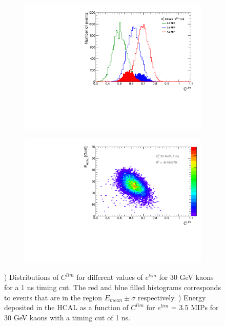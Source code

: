 \begin{figure}[htbp!]
  \centering
  \begin{subfigure}[t]{0.49\textwidth}
    \centering
    \includegraphics[width=1\linewidth]{../Thesis_Plots/ILD/AdditionalPlots/Plots/CLim_1ns_30GeV.pdf}
    \caption{} \label{fig:CLim30_1ns}
  \end{subfigure}
  \hfill
  \begin{subfigure}[t]{0.49\textwidth}
    \centering
    \includegraphics[width=1\linewidth]{../Thesis_Plots/ILD/AdditionalPlots/Plots/EhcalCLim_1ns_30GeV.pdf}
    \caption{} \label{fig:EhcalCLim30_1ns}
  \end{subfigure}
  \caption{) Distributions of $C^{lim}$ for different values of $e^{lim}$ for 30 GeV kaons for a 1 ns timing cut. The red and blue filled histograms corresponds to events that are in the region $E_{mean} \pm \sigma$ respectively. ) Energy deposited in the HCAL as a function of $C^{lim}$ for $e^{lim}$ = 3.5 MIPs for 30 GeV kaons with a timing cut of 1 ns.}
\end{figure}
